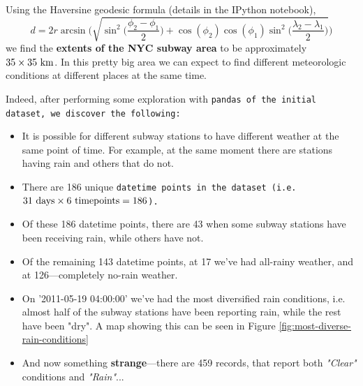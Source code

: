 \documentclass{article}
\begin{document}
Using the Haversine geodesic formula (details in the IPython notebook), 
$$d = 2 r \arcsin \Bigg( \sqrt{ \sin^2 \bigg(\frac{\phi_2 - \phi_1} {2} \bigg) + \cos( \phi_2)\cos(\phi_1)\sin^2\bigg(\frac{\lambda_2 - \lambda_1} {2} \bigg) }\Bigg)$$
we find the \textbf{extents of the NYC subway area} to be approximately $35 \times 35 \ \rm km$. In this pretty big area we can expect to find different meteorologic conditions at different places at the same time.

Indeed, after performing some exploration with \tt pandas \rm of the initial dataset, we discover the following:
\begin{itemize}
\item It is possible for different subway stations to have different weather at the same point of time. For example, at the same moment there are stations having rain and others that do not.
\item There are 186 unique \tt datetime \rm points in the dataset (i.e. $31 \ \rm days \times 6 \ timepoints = 186$).
\item Of these 186 datetime points, there are 43 when some subway stations have been receiving rain, while others have not.
\item Of the remaining 143 datetime points, at 17 we've had all-rainy weather, and at 126---completely no-rain weather.
\item On '2011-05-19 04:00:00' we've had the most diversified rain conditions, i.e. almost half of the subway stations have been reporting rain, while the rest have been "dry". A map showing this can be seen in Figure \ref{fig:most-diverse-rain-conditions}
\item And now something \textbf{strange}---there are 459 records, that report both \emph{"Clear"} conditions and \emph{"Rain"}...
\end{itemize}
\end{document}

